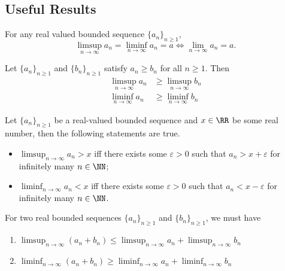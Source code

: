 \documentclass[parskip=half, numbers=endperiod, 11pt]{scrartcl}
\begin{document}
\subsection{Useful Results}

\begin{theorem}\label{thm:limsup_liminf_equal}
	For any real valued bounded sequence
	$\{a_n\}_{n \ge 1}$,
	\[\limsup_{n \to \infty} a_n = \liminf_{n \to \infty} a_n = a \iff \lim_{n \to \infty} a_n = a. \]
\end{theorem}

\begin{theorem}[Monotonicity]
	Let $\{a_n\}_{n \ge 1}$ and $\{b_n\}_{n \ge 1}$
	satisfy $a_n \ge b_n$ for all $n \ge 1$. Then
	\begin{align*}
		\limsup_{n \to \infty} a_n & \ge \limsup_{n \to \infty} b_n \\
		\liminf_{n \to \infty} a_n & \ge \liminf_{n \to \infty} b_n
	\end{align*}
\end{theorem}


\begin{theorem}\label{thm:bounds_on_limsup}
	Let $\{a_n\}_{n \ge 1}$ be a real-valued bounded
	sequence and $x \in \RR$ be some real number, then the
	following statements are true.
	\begin{itemize}
		\item $\limsup_{n \to \infty} a_n > x$ iff there
		      exists some $\varepsilon > 0$ such that
		      $a_n > x + \varepsilon$ for infinitely many
		      $n \in \NN$;
		\item $\liminf_{n \to \infty} a_n < x$ iff there
		      exists some $\varepsilon > 0$ such that
		      $a_n < x - \varepsilon$ for infinitely many
		      $n \in \NN$.
	\end{itemize}
\end{theorem}

\begin{theorem}
	For two real bounded sequences $\{a_n\}_{n \ge 1}$
	and $\{b_n\}_{n \ge 1}$, we must have
	\begin{enumerate}
		\item $\displaystyle \limsup_{n \to \infty} (a_n + b_n) \le \limsup_{n \to \infty} a_n + \limsup_{n \to \infty} b_n$
		\item $\displaystyle \liminf_{n \to \infty} (a_n + b_n) \ge \liminf_{n \to \infty} a_n + \liminf_{n \to \infty} b_n$
	\end{enumerate}
\end{theorem}
\end{document}
